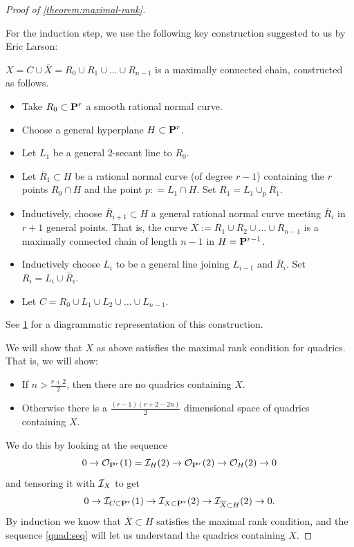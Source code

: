 \documentclass[11pt, two side, letterpaper, final]{amsart}
\renewcommand{\P}{{\bf P}}
\begin{document}
\begin{proof}[Proof of \cref{theorem:maximal-rank}]
\begin{figure}
\begin{center}
\label{figure:erics-curve}
\end{center}
\end{figure}

For the induction step, we use the following key construction suggested to us by Eric Larson:
\begin{construction}
\label{construction:eric}
$X = C \cup \overline{X} = R_0 \cup R_1 \cup \ldots \cup R_{n-1}$ is a maximally connected chain, constructed as follows.
\begin{itemize}
	\item Take $R_0 \subset \P^r$ a smooth rational normal curve.
	\item Choose a general hyperplane $H \subset \P^r$.
	\item Let $L_1$ be a general 2-secant line to $R_0$.
	\item Let $\overline{R}_1 \subset H$ be a rational normal curve (of degree $r-1$) containing the $r$ points $R_0 \cap H$ and the point $p : = L_1 \cap H$. Set $R_1=L_1\cup_p \overline{R}_1$.
	\item Inductively, choose $\overline{R}_{i+1} \subset H$ a general rational normal curve meeting $\overline{R}_i$ in
	$r+1$ general points. That is, the curve $\overline{X} := \overline{R}_1 \cup \overline{R}_2 \cup \ldots \cup \overline{R}_{n-1}$ is a maximally connected chain of length $n-1$ in $H= \P^{r-1}$.
	\item Inductively choose $L_i$ to be a general line joining $L_{i-1}$ and $\overline{R}_i$. Set
	$R_i= L_{i} \cup \overline{R}_i$.
	\item Let $C = R_0 \cup L_1 \cup L_2 \cup \ldots \cup L_{n-1}$.
\end{itemize}
See \cref{figure:erics-curve} for a diagrammatic representation of this construction. 
\end{construction}


We will show that $X$ as above satisfies the maximal rank condition for quadrics. That is, we will show: 
\begin{itemize} 
\item If $n> \frac{r+2}{2}$, then there are no quadrics containing $X$. 
\item Otherwise there is a $\frac{(r-1)(r+2-2n)}{2}$ dimensional space of quadrics containing $X$.
\end{itemize}
We do this by looking at the sequence
\[
	0 \to \sh{O}_{\P^r}(1)= \sh{I}_H(2) \to \sh{O}_{\P^r}(2) \to \sh{O}_H(2) \to 0
\]
and tensoring it with ${\mathcal I}_X$ to get
\begin{equation}\label{quad:seq}
	0 \to \sh{I}_{C \subset \P^r}(1) \to \sh{I}_{X \subset \P^r}(2) \to \sh{I}_{\overline{X} \subset H}(2) \to 0.
\end{equation}
 By induction we know that $\overline{X} \subset H$ satisfies the maximal rank condition, and
 the sequence \eqref{quad:seq} will let us understand the quadrics containing $X$.


\end{proof}
\end{document}
